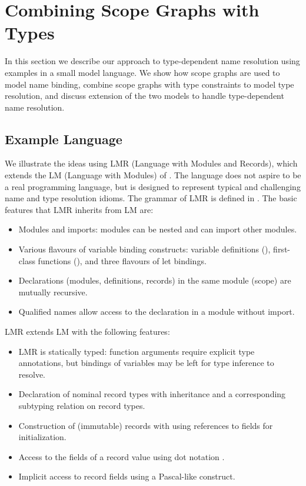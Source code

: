 \section{Combining Scope Graphs with Types}

In this section we describe our approach to type-dependent name resolution using
examples in a small model language. We show how scope graphs are used to model
name binding, combine scope graphs with type constraints to model type
resolution, and discuss extension of the two models to handle type-dependent
name resolution.

\subsection{Example Language}

We illustrate the ideas using LMR (Language with Modules and Records), which 
extends the LM (Language with Modules) of \cite{NeronTVW-ESOP-2015}.
The language does not aspire to be a real programming language, but is designed
to represent typical and challenging name and type resolution idioms.
The grammar of LMR is defined in .
The basic features that LMR inherits from LM are:
\begin{itemize}
  \item Modules and imports: modules can be nested and can import other modules.
  \item Various flavours of variable binding constructs: variable
  definitions (), first-class functions (), and three flavours
  of let bindings.
  \item Declarations (modules, definitions, records) in the same module
  (scope) are mutually recursive.
  \item Qualified names allow access to the declaration in a module without
  import.
\end{itemize}

\noindent
LMR extends LM with the following features:

\begin{itemize}
  \item LMR is statically typed: function arguments require explicit type
  annotations, but bindings of variables may be left for type inference to
  resolve.
  \item Declaration of nominal record types with inheritance and a corresponding
  subtyping relation on record types.
  \item Construction of (immutable) records with  using references to fields for
  initialization.
  \item Access to the fields of a record value using dot notation .
  \item Implicit access to record fields using a Pascal-like 
  construct.
\end{itemize}

